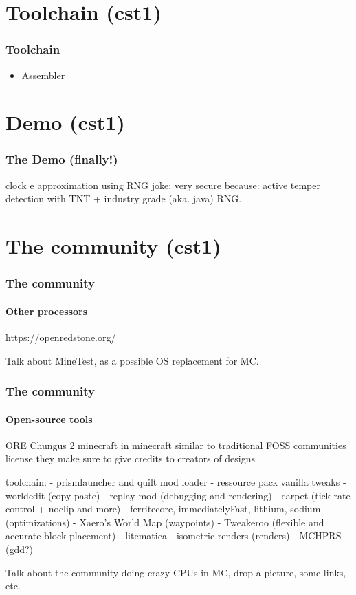 \documentclass[aspectratio=169]{beamer}
\begin{document}
\section{Toolchain (cst1)}
\begin{frame}[fragile]
	\frametitle{Toolchain}
	\begin{itemize}
		\item Assembler
	\end{itemize}
\end{frame}

\section{Demo (cst1)}

\begin{frame}
	\frametitle{The Demo (finally!)}
	clock
	e approximation using RNG
	joke: very secure because: active temper detection with TNT + industry grade (aka. java) RNG.
\end{frame}

\section{The community (cst1)}

\begin{frame}
	\frametitle{The community}
	\framesubtitle{Other processors}

	https://openredstone.org/

	Talk about MineTest, as a possible OS replacement for MC.
\end{frame}

\begin{frame}
	\frametitle{The community}
	\framesubtitle{Open-source tools}

\end{frame}

\begin{frame}
	ORE
	Chungus 2
	minecraft in minecraft
	similar to traditional FOSS communities
	license
	they make sure to give credits to creators of designs

	toolchain:
	- prismlauncher and quilt mod loader
	- ressource pack vanilla tweaks
	- worldedit (copy paste)
	- replay mod (debugging and rendering)
	- carpet (tick rate control + noclip and more)
	- ferritecore, immediatelyFast, lithium, sodium (optimizations)
	- Xaero's World Map (waypoints)
	- Tweakeroo (flexible and accurate block placement)
	- litematica
	- isometric renders (renders)
	- MCHPRS (gdd?)

	Talk about the community doing crazy CPUs in MC, drop a picture, some
	links, etc.
\end{frame}
\end{document}
